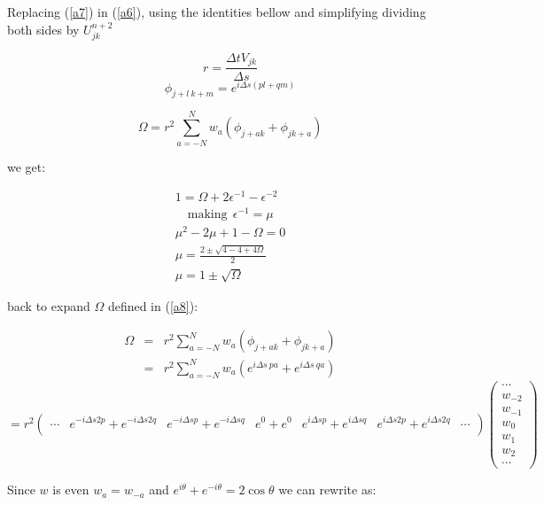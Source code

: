 \documentclass[legalpaper, 12pt]{article}
\begin{document}
Replacing (\ref{a7}) in (\ref{a6}), using the identities bellow and simplifying dividing both sides by $ U_{jk}^{n+2} $

$$ r = \frac{\Delta t  V_{jk}}{\Delta s} $$
$$ \phi_{j+l\ k+m} = e^{i \Delta s \left( pl+qm \right)} $$

\begin{equation}
\Omega = r^2 \sum_{a=-N}^N  w_a \left( \phi_{j+a k} + \phi_{j k+a}  \right) \label{a8}
\end{equation}

we get:

\begin{eqnarray}
1  =  \Omega + 2 \epsilon^{-1} -\epsilon^{-2} \nonumber \\
\quad \text{making} \ \ \epsilon^{-1} = \mu \nonumber \\
\mu^2 - 2 \mu + 1 -\Omega = 0 \nonumber \\
\mu = \frac{ 2 \pm \sqrt{ 4 - 4 +4 \Omega}}{2} \nonumber \\
\mu = 1 \pm \sqrt{ \Omega} \label{a9}
\end{eqnarray}

back to expand $ \Omega $ defined in (\ref{a8}):

\begin{eqnarray}
\Omega &=& r^2 \sum_{a=-N}^N  w_a \left( \phi_{j+a k} + \phi_{j k+a}  \right) \nonumber \\
	&=& r^2 \sum_{a=-N}^{N} w_a ( e^{i \Delta s \ p a} + e^{i \Delta s \ q a} )\nonumber 
\end{eqnarray}
\begin{equation}
=r^2
\begin{pmatrix}
 \cdots & e^{-i \Delta s 2 p} + e^{-i \Delta s 2 q} & e^{-i \Delta s p} + e^{-i \Delta s q} & e^0+e^0 & e^{i \Delta s p} + e^{i \Delta s q} & e^{i \Delta s 2 p} + e^{i \Delta s 2 q} & \cdots \\
\end{pmatrix}
\begin{pmatrix}
\cdots \\
w_{-2} \\
w_{-1} \\
w_0 \\
w_1 \\
w_2 \\
\cdots
\end{pmatrix}
\nonumber
\end{equation}

Since $w$ is even $ w_a = w_{-a} $ and $ e^{i\theta} + e^{-i\theta} = 2 \cos{\theta} $ we can rewrite as:
\end{document}
